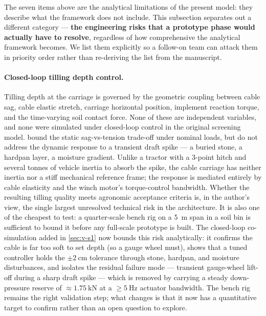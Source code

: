 \documentclass[11pt,a4paper]{article}
\begin{document}
The seven items above are the analytical limitations of the present model: they describe what the framework does not include. This subsection separates out a different category --- \textbf{the engineering risks that a prototype phase would actually have to resolve}, regardless of how comprehensive the analytical framework becomes. We list them explicitly so a follow-on team can attack them in priority order rather than re-deriving the list from the manuscript.

\paragraph{Closed-loop tilling depth control.} Tilling depth at the carriage is governed by the geometric coupling between cable sag, cable elastic stretch, carriage horizontal position, implement reaction torque, and the time-varying soil contact force. None of these are independent variables, and none were simulated under closed-loop control in the original screening model.  bound the static sag-vs-tension trade-off under nominal loads, but do not address the dynamic response to a transient draft spike --- a buried stone, a hardpan layer, a moisture gradient. Unlike a tractor with a 3-point hitch and several tonnes of vehicle inertia to absorb the spike, the cable carriage has neither inertia nor a stiff mechanical reference frame; the response is mediated entirely by cable elasticity and the winch motor's torque-control bandwidth. Whether the resulting tilling quality meets agronomic acceptance criteria is, in the author's view, the single largest unresolved technical risk in the architecture. It is also one of the cheapest to test: a quarter-scale bench rig on a \SI{5}{\meter} span in a soil bin is sufficient to bound it before any full-scale prototype is built. The closed-loop co-simulation added in \cref{sec:v-s1} now bounds this risk analytically: it confirms the cable is far too soft to set depth (so a gauge wheel must), shows that a tuned controller holds the \(\pm\SI{2}{\centi\meter}\) tolerance through stone, hardpan, and moisture disturbances, and isolates the residual failure mode --- transient gauge-wheel lift-off during a sharp draft spike --- which is removed by carrying a steady down-pressure reserve of ${\approx}\SI{1.75}{\kilo\newton}$ at a ${\geq}\SI{5}{\hertz}$ actuator bandwidth. The bench rig remains the right validation step; what changes is that it now has a quantitative target to confirm rather than an open question to explore.
\end{document}
